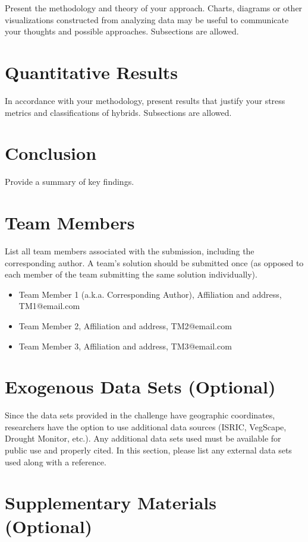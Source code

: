 \documentclass[syngen,nonblindrev]{informs3-syngen}
\begin{document}
Present the methodology and theory of your approach. Charts, diagrams or other
visualizations constructed from analyzing data may be useful to communicate your thoughts
and possible approaches. Subsections are allowed. 


\section{Quantitative Results}

In accordance with your methodology, present results that justify your stress metrics and classifications of hybrids. Subsections are allowed.

\section{Conclusion}

Provide a summary of key findings.

\section{Team Members}

List all team members associated with the submission, including the corresponding author. A team’s solution should be submitted once (as opposed to each member of the team submitting the same solution individually).

\begin{itemize}
\item Team Member 1 (a.k.a. Corresponding Author), Affiliation and address, TM1@email.com
\item Team Member 2, Affiliation and address, TM2@email.com
\item Team Member 3, Affiliation and address, TM3@email.com
\end{itemize}

\section{Exogenous Data Sets (Optional)}

Since the data sets provided in the challenge have geographic coordinates, researchers have the option to use additional data sources (ISRIC, VegScape, Drought Monitor, etc.). Any additional data sets used must be available for public use and properly cited. In this section, please list any external data sets used along with a reference.


\section{Supplementary Materials (Optional)}
\end{document}

